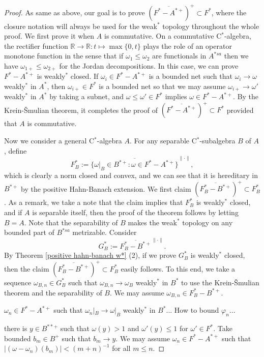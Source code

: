 \documentclass[a4paper]{amsart}
\theoremstyle{plain}
\theoremstyle{definition}
\begin{document}
\begin{proof}
As same as above, our goal is to prove $(\overline{F^*-A^{*+}})^+\subset F^*$, where the closure notation will always be used for the weak$^*$ topology throughout the whole proof.
We first prove it when $A$ is commutative.
On a commutative C$^*$-algebra, the rectifier function $\mathbb{R}\to\mathbb{R}:t\mapsto\max\{0,t\}$ plays the role of an operator monotone function in the sense that if $\omega_1\le\omega_2$ are functionals in $A^{*sa}$ then we have $\omega_{1+}\le\omega_{2+}$ for the Jordan decompositions.
In this case, we can prove $F^*-A^{*+}$ is weakly$^*$ closed.
If $\omega_i\in F^*-A^{*+}$ is a bounded net such that $\omega_i\to\omega$ weakly$^*$ in $A^*$, then $\omega_{i+}\in F^*$ is a bounded net so that we may assume $\omega_{i+}\to\omega'$ weakly$^*$ in $A^*$ by taking a subnet, and $\omega\le\omega'\in F^*$ implies $\omega\in F^*-A^{*+}$.
By the Krein-\v Smulian theorem, it completes the proof of $(\overline{F^*-A^{*+}})^+\subset F^*$ provided that $A$ is commutative.

Now we consider a general C$^*$-algebra $A$.
For any separable C$^*$-subalgebra $B$ of $A$, define
\[F_B^*:=\overline{\{\omega|_B\in B^{*+}:\omega\in F^*-A^{*+}\}}^{\|\cdot\|},\]
which is clearly a norm closed and convex, and we can see that it is hereditary in $B^{*+}$ by the positive Hahn-Banach extension.
We first claim $(\overline{F_B^*-B^{*+}})^+\subset F_B^*$.
As a remark, we take a note that the claim implies that $F_B^*$ is weakly$^*$ closed, and if $A$ is separable itself, then the proof of the theorem follows by letting $B=A$.
Note that the separability of $B$ makes the weak$^*$ topology on any bounded part of $B^{*sa}$ metrizable.
Consider
\[G_B^*:=\overline{F_B^*-B^{*+}}^{\|\cdot\|}.\]
By Theorem \ref{positive hahn-banach w*} (2), if we prove $G_B^*$ is weakly$^*$ closed, then the claim $(\overline{F_B^*-B^{*+}})^+\subset F_B^*$ easily follows.
To this end, we take a sequence $\omega_{B,n}\in G_B^*$ such that $\omega_{B,n}\to\omega_B$ weakly$^*$ in $B^*$ to use the Krein-\v Smulian theorem and the separability of $B$.
We may assume $\omega_{B,n}\in F_B^*-B^{*+}$.

$\omega_n\in F^*-A^{*+}$ such that $\omega_n|_B\to\omega|_B$ weakly$^*$ in $B^*$...
How to bound $\varphi_n$...

there is $y\in B^{**+}$ such that $\omega(y)>1$ and $\omega'(y)\le1$ for $\omega'\in F^*$.
Take bounded $b_m\in B^+$ such that $b_m\to y$.
We may assume $\omega_n\in F^*-A^{*+}$ such that $|(\omega-\omega_n)(b_m)|<(m+n)^{-1}$ for all $m\le n$.


\end{proof}
\end{document}
